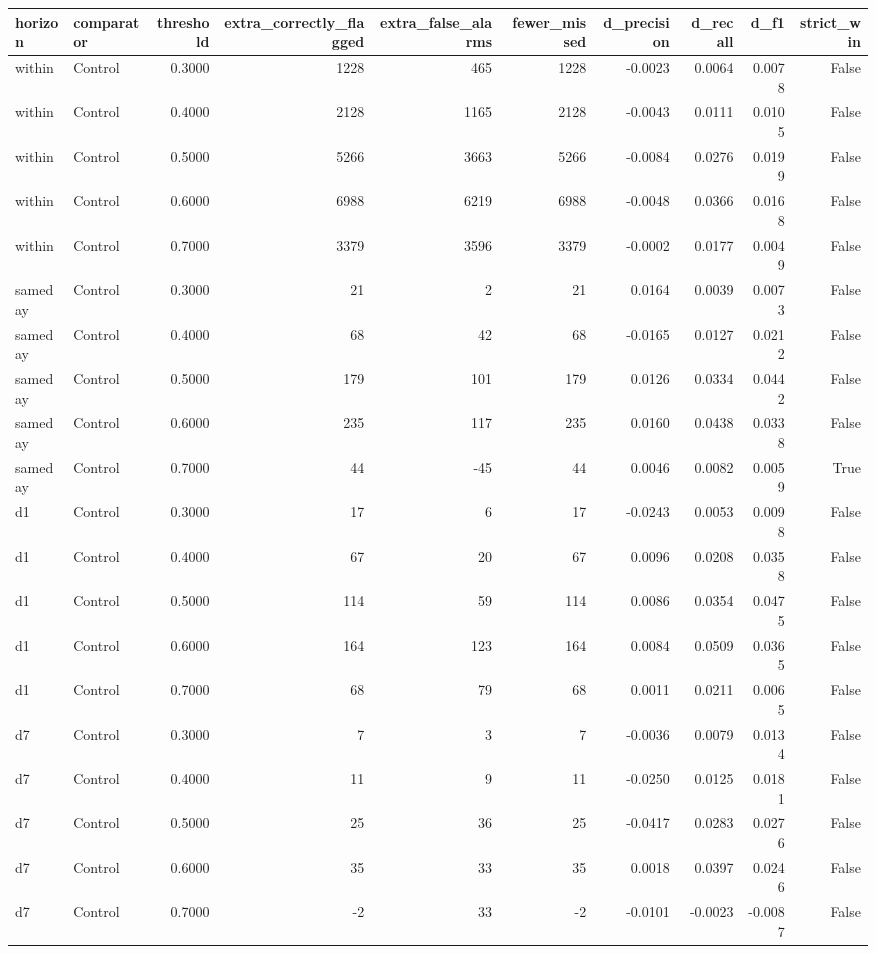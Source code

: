 \begin{tabular}{llrrrrrrrr}
\toprule
horizon & comparator & threshold & extra\_correctly\_flagged & extra\_false\_alarms & fewer\_missed & d\_precision & d\_recall & d\_f1 & strict\_win \\
\midrule
within & Control & 0.3000 & 1228 & 465 & 1228 & -0.0023 & 0.0064 & 0.0078 & False \\
within & Control & 0.4000 & 2128 & 1165 & 2128 & -0.0043 & 0.0111 & 0.0105 & False \\
within & Control & 0.5000 & 5266 & 3663 & 5266 & -0.0084 & 0.0276 & 0.0199 & False \\
within & Control & 0.6000 & 6988 & 6219 & 6988 & -0.0048 & 0.0366 & 0.0168 & False \\
within & Control & 0.7000 & 3379 & 3596 & 3379 & -0.0002 & 0.0177 & 0.0049 & False \\
sameday & Control & 0.3000 & 21 & 2 & 21 & 0.0164 & 0.0039 & 0.0073 & False \\
sameday & Control & 0.4000 & 68 & 42 & 68 & -0.0165 & 0.0127 & 0.0212 & False \\
sameday & Control & 0.5000 & 179 & 101 & 179 & 0.0126 & 0.0334 & 0.0442 & False \\
sameday & Control & 0.6000 & 235 & 117 & 235 & 0.0160 & 0.0438 & 0.0338 & False \\
sameday & Control & 0.7000 & 44 & -45 & 44 & 0.0046 & 0.0082 & 0.0059 & True \\
d1 & Control & 0.3000 & 17 & 6 & 17 & -0.0243 & 0.0053 & 0.0098 & False \\
d1 & Control & 0.4000 & 67 & 20 & 67 & 0.0096 & 0.0208 & 0.0358 & False \\
d1 & Control & 0.5000 & 114 & 59 & 114 & 0.0086 & 0.0354 & 0.0475 & False \\
d1 & Control & 0.6000 & 164 & 123 & 164 & 0.0084 & 0.0509 & 0.0365 & False \\
d1 & Control & 0.7000 & 68 & 79 & 68 & 0.0011 & 0.0211 & 0.0065 & False \\
d7 & Control & 0.3000 & 7 & 3 & 7 & -0.0036 & 0.0079 & 0.0134 & False \\
d7 & Control & 0.4000 & 11 & 9 & 11 & -0.0250 & 0.0125 & 0.0181 & False \\
d7 & Control & 0.5000 & 25 & 36 & 25 & -0.0417 & 0.0283 & 0.0276 & False \\
d7 & Control & 0.6000 & 35 & 33 & 35 & 0.0018 & 0.0397 & 0.0246 & False \\
d7 & Control & 0.7000 & -2 & 33 & -2 & -0.0101 & -0.0023 & -0.0087 & False \\

\end{tabular}
